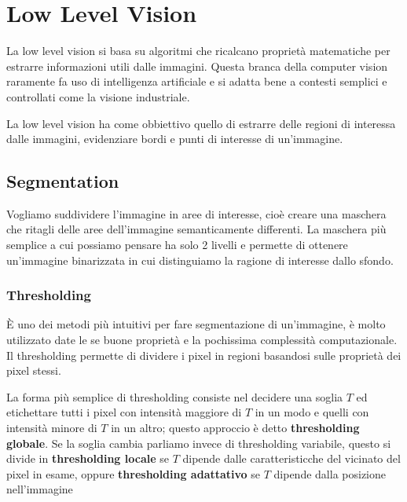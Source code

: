 \chapter{Low Level Vision}
La low level vision si basa su algoritmi che ricalcano proprietà matematiche per estrarre informazioni utili dalle immagini. Questa branca della computer vision raramente fa uso di intelligenza artificiale e si adatta bene a contesti semplici e controllati come la visione industriale.

La low level vision ha come obbiettivo quello di estrarre delle regioni di interessa dalle immagini, evidenziare bordi e punti di interesse di un'immagine.

\section{Segmentation}
Vogliamo suddividere l'immagine in aree di interesse, cioè creare una maschera che ritagli delle aree dell'immagine semanticamente differenti. La maschera più semplice a cui possiamo pensare ha solo 2 livelli e permette di ottenere un'immagine binarizzata in cui distinguiamo la ragione di interesse dallo sfondo.

\subsection{Thresholding}
È uno dei metodi più intuitivi per fare segmentazione di un'immagine, è molto utilizzato date le se buone proprietà e la pochissima complessità computazionale. Il thresholding permette di dividere i pixel in regioni basandosi sulle proprietà dei pixel stessi.

La forma più semplice di thresholding consiste nel decidere una soglia $T$ ed etichettare tutti i pixel con intensità maggiore di $T$ in un modo e quelli con intensità minore di $T$ in un altro; questo approccio è detto \textbf{thresholding globale}. Se la soglia cambia parliamo invece di thresholding variabile, questo si divide in \textbf{thresholding locale} se $T$ dipende dalle caratteristicche del vicinato del pixel in esame, oppure \textbf{thresholding adattativo} se $T$ dipende dalla posizione nell'immagine